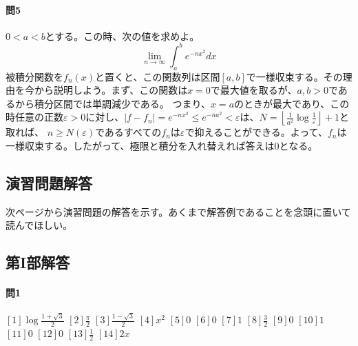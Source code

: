 \documentclass[a4j,dvipdfmx]{jsarticle}
\begin{document}
                \paragraph{問5}$0<a<b$とする。この時、次の値を求めよ。
                    \begin{equation*}
                        \lim_{n\to\infty}\int_{a}^{b}e^{-nx^2}dx
                    \end{equation*}
                    被積分関数を$f_n(x)$と置くと、この関数列は区間$[a,b]$で一様収束する。その理由を今から説明しよう。まず、この関数は$x=0$で最大値を取るが、$a,b>0$であるから積分区間では単調減少である。
                    つまり、$x=a$のときが最大であり、この時任意の正数$\varepsilon>0$に対し、$|f-f_n|=e^{-nx^2}\leq e^{-na^2}<\varepsilon$は、$\displaystyle N=\left\lfloor\frac{1}{a^2}\log\frac{1}{\varepsilon}\right\rfloor +1$と取れば、
                    $n\geq N(\varepsilon)$であるすべての$f_n$は$\varepsilon$で抑えることができる。よって、$f_n$は一様収束する。したがって、極限と積分を入れ替えれば答えは$0$となる。
            \clearpage

        \clearpage
        \subsection{演習問題解答}
            次ページから演習問題の解答を示す。あくまで解答例であることを念頭に置いて読んでほしい。
            \clearpage
            \subsection*{第I部解答}
                \paragraph{問1}
                    $[1]\log\frac{1+\sqrt{3}}{2}$\hspace{1mm}
                    $[2]\frac{\pi}{2}$\hspace{1mm}
                    $[3]\frac{1-\sqrt{3}}{2}$\hspace{1mm}
                    $[4]x^2$\hspace{1mm}
                    $[5]0$\hspace{1mm}
                    $[6]0$\hspace{1mm}
                    $[7]1$\hspace{1mm}
                    $[8]\frac{3}{2}$\hspace{1mm}
                    $[9]0$\hspace{1mm}
                    $[10]1$\hspace{1mm}
                    $[11]0$\hspace{1mm}
                    $[12]0$\hspace{1mm}
                    $[13]\frac{1}{2}$\hspace{1mm}
                    $[14]2x$
\end{document}
